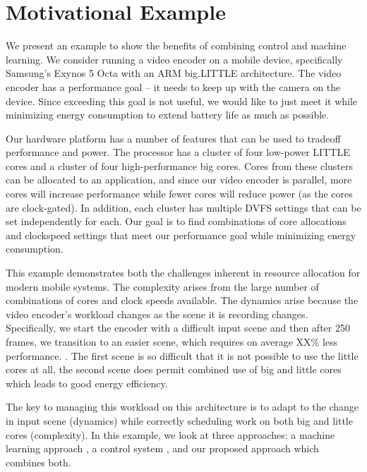 \section{Motivational Example}
\label{sec:example}

We present an example to show the benefits of combining control and
machine learning.  We consider running a video encoder on a mobile
device, specifically Samsung's Exynos 5 Octa with an ARM big.LITTLE
architecture.  The video encoder has a performance goal -- it needs to
keep up with the camera on the device.  Since exceeding this goal is
not useful, we would like to just meet it while minimizing energy
consumption to extend battery life as much as possible.  

Our hardware platform has a number of features that can be used to
tradeoff performance and power.  The processor has a cluster of four
low-power LITTLE cores and a cluster of four high-performance big
cores.  Cores from these clusters can be allocated to an application,
and since our video encoder is parallel, more cores will increase
performance while fewer cores will reduce power (as the cores are
clock-gated).  In addition, each cluster has multiple DVFS settings
that can be set independently for each.  Our goal is to find
combinations of core allocations and clockspeed settings that meet our
performance goal while minimizing energy consumption.

This example demonstrates both the challenges inherent in resource
allocation for modern mobile systems.  The complexity arises from the
large number of combinations of cores and clock speeds available.  The
dynamics arise because the video encoder's workload changes as the
scene it is recording changes.  Specifically, we start the encoder
with a difficult input scene and then after 250 frames, we transition
to an easier scene, which requires on average XX\% less performance.
.  The first
scene is so difficult that it is not possible to use the little cores
at all, the second scene does permit combined use of big and little
cores which leads to good energy efficiency.  

The key to managing this workload on this architecture is to adapt to
the change in input scene (dynamics) while correctly scheduling work
on both big and little cores (complexity).  In this example, we look
at three approaches: a machine learning approach \cite{}, a control
system \cite{}, and our proposed approach which combines both.

